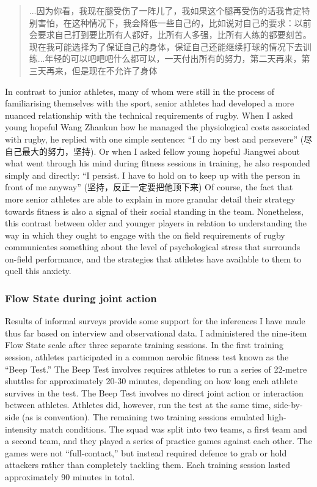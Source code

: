 \begin{CJK}{UTF8}{gbsn}
\begin{quotation}
      ...因为你看，我现在腿受伤了一阵儿了，我如果这个腿再受伤的话我肯定特别害怕，在这种情况下，我会降低一些自己的，比如说对自己的要求：以前会要求自己打到要比所有人都好，比所有人多强，比所有人练的都要刻苦。现在我可能选择为了保证自己的身体，保证自己还能继续打球的情况下去训练...年轻的可以吧吧吧什么都可以，一天付出所有的努力，第二天再来，第三天再来，但是现在不允许了身体
\end{quotation}

In contrast to junior athletes, many of whom were still in the process of familiarising themselves with the sport, senior athletes had developed a more nuanced relationship with the technical requirements of rugby.  When I asked young hopeful Wang Zhankun how he managed the physiological costs associated with rugby, he replied with one simple sentence: ``I do my best and persevere'' (尽自己最大的努力，坚持). Or when I asked fellow young hopeful Jiangwei about what went through his mind during fitness sessions in training, he also responded simply and directly: ``I persist. I have to hold on to keep up with the person in front of me anyway'' (坚持，反正一定要把他顶下来) Of course, the fact that more senior athletes are able to explain in more granular detail their strategy towards fitness is also a signal of their social standing in the team.  Nonetheless, this contrast between older and younger players in relation to understanding the way in which they ought to engage with the on field requirements of rugby communicates something about the level of psychological stress that surrounds on-field performance, and the strategies that athletes have available to them to quell this anxiety.



\subsubsection{Flow State during joint action}

Results of informal surveys provide some support for the inferences I have made thus far based on interview and observational data.  I administered the nine-item Flow State scale after three separate training sessions.  In the first training session, athletes participated in a common aerobic fitness test known as the ``Beep Test.''  The Beep Test involves requires athletes to run a series of 22-metre shuttles for approximately 20-30 minutes, depending on how long each athlete survives in the test.  The Beep Test involves no direct joint action or interaction between athletes.  Athletes did, however, run the test at the same time, side-by-side (as is convention).  The remaining two training sessions emulated high-intensity match conditions.  The squad was split into two teams, a first team and a second team, and they played a series of practice games against each other.  The games were not ``full-contact,'' but instead required defence to grab or hold attackers rather than completely tackling them. Each training session lasted approximately 90 minutes in total.


\end{CJK}
